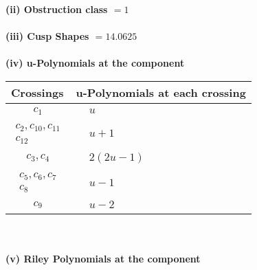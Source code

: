\documentclass[1p]{elsarticle_modified}
\theoremstyle{definition}
\begin{document}
\flushleft \textbf{(ii) Obstruction class $= 1$}\\~\\
\flushleft \textbf{(iii) Cusp Shapes $= 14.0625$}\\~\\
\newpage\renewcommand{\arraystretch}{1}
\flushleft \textbf{(iv) u-Polynomials at the component}\newline \\
\begin{tabular}{m{50pt}|m{274pt}}
Crossings & \hspace{64pt}u-Polynomials at each crossing \\
\hline $$\begin{aligned}c_{1}\end{aligned}$$&$\begin{aligned}
&u
\end{aligned}$\\
\hline $$\begin{aligned}c_{2},c_{10},c_{11}\\c_{12}\end{aligned}$$&$\begin{aligned}
&u+1
\end{aligned}$\\
\hline $$\begin{aligned}c_{3},c_{4}\end{aligned}$$&$\begin{aligned}
&2(2 u-1)
\end{aligned}$\\
\hline $$\begin{aligned}c_{5},c_{6},c_{7}\\c_{8}\end{aligned}$$&$\begin{aligned}
&u-1
\end{aligned}$\\
\hline $$\begin{aligned}c_{9}\end{aligned}$$&$\begin{aligned}
&u-2
\end{aligned}$\\
\hline
\end{tabular}\\~\\
\newpage\renewcommand{\arraystretch}{1}
\flushleft \textbf{(v) Riley Polynomials at the component}\newline \\
\end{document}
